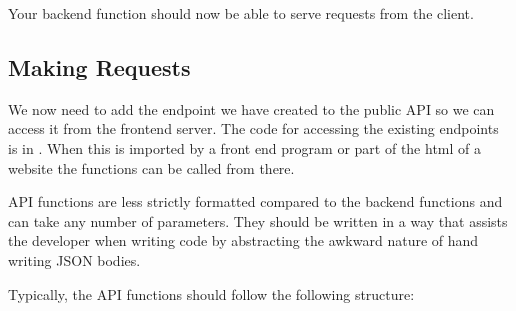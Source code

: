 \documentclass[letterpaper,10pt,english]{sphinxmanual}
\let\oldsubsection\subsection
\renewcommand{\subsection}{\needspace{6\baselineskip}\oldsubsection}
\begin{document}
Your back\sphinxhyphen{}end function should now be able to serve requests from the
client.


\subsection{Making Requests}
\label{\detokenize{docs/Expansion/api-expansion:making-requests}}
We now need to add the end\sphinxhyphen{}point we have created to the public API so we
can access it from the front\sphinxhyphen{}end server. The code for accessing the
existing endpoints is in . When this is imported by a
front end program or part of the html of a website the functions can be
called from there.

API functions are less strictly formatted compared to the back\sphinxhyphen{}end
functions and can take any number of parameters. They should be written
in a way that assists the developer when writing code by abstracting the
awkward nature of hand writing JSON bodies.

Typically, the API functions should follow the following structure:

\begin{sphinxVerbatim}[commandchars=\\\{\}]
      
          
           
         
         
         
             
         

      
         
     
\end{sphinxVerbatim}
\end{document}
